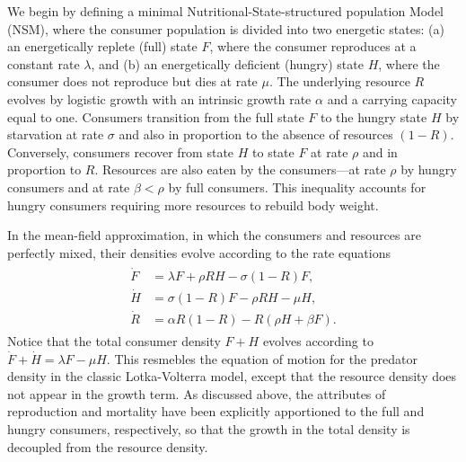 \documentclass{pnastwo}
\begin{document}
\begin{article}
We begin by defining a minimal Nutritional-State-structured population Model
(NSM), where the consumer population is divided into two energetic states:
(a) an energetically replete (full) state $F$, where the consumer reproduces
at a constant rate $\lambda$, and (b) an energetically deficient (hungry)
state $H$, where the consumer does not reproduce but dies at rate $\mu$.  The
underlying resource $R$ evolves by logistic growth with an intrinsic growth
rate $\alpha$ and a carrying capacity equal to one.  Consumers transition
from the full state $F$ to the hungry state $H$ by starvation at rate
$\sigma$ and also in proportion to the absence of resources $(1-R)$.
Conversely, consumers recover from state $H$ to state $F$ at rate $\rho$ and
in proportion to $R$.  Resources are also eaten by the consumers---at rate
$\rho$ by hungry consumers and at rate $\beta<\rho$ by full consumers.  This
inequality accounts for hungry consumers requiring more resources to rebuild
body weight.

In the mean-field approximation, in which the consumers and resources are
perfectly mixed, their densities evolve according to the rate equations
\begin{eqnarray} 
\label{eq:system}
\begin{split}
\dot{F} &= \lambda F + \rho RH - \sigma (1-R)F,  \\
\dot{H} &= \sigma (1-R)F - \rho RH - \mu H,  \\
\dot{R} &= \alpha R(1-R) - R(\rho H+ \beta F).
\end{split}
\end{eqnarray}
Notice that the total consumer density $F+H$ evolves according to
$\dot{F}+\dot{H}=\lambda F-\mu H$.  This resmebles the equation of motion for
the predator density in the classic Lotka-Volterra model, except that the
resource density does not appear in the growth term.  As discussed above, the
attributes of reproduction and mortality have been explicitly apportioned to
the full and hungry consumers, respectively, so that the growth in the total
density is decoupled from the resource density.


\end{article}
\end{document}
